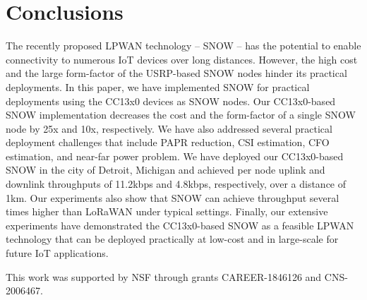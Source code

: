 \documentclass[acmsmall]{acmart}
\begin{document}



\maketitle
\renewcommand{\shortauthors}{Rahman, M. et al.}








\section{Conclusions}\label{sec:conclusion}
The recently proposed LPWAN technology -- SNOW -- has the potential to enable connectivity to numerous IoT devices over long distances. However, the high cost and the large form-factor of the USRP-based SNOW nodes hinder its practical deployments. In this paper, we have implemented SNOW for practical deployments using the CC13x0 devices as SNOW nodes. Our CC13x0-based SNOW implementation decreases the cost and the form-factor of a single SNOW node by 25x and 10x, respectively. 
We have also addressed several practical deployment challenges that include PAPR reduction, CSI estimation, CFO estimation, and near-far power problem. 
We have deployed our CC13x0-based SNOW in the city of Detroit, Michigan and achieved per node uplink and downlink throughputs of 11.2kbps and 4.8kbps, respectively, over a distance of 1km. 
Our experiments also show that SNOW can achieve throughput several times higher than LoRaWAN under typical settings.
Finally, our extensive experiments have demonstrated the CC13x0-based SNOW as a feasible LPWAN technology that can be deployed practically at low-cost and in large-scale for future IoT applications.
\begin{acks}
This work was supported by NSF through grants CAREER-1846126 and CNS-2006467.
\end{acks}



\end{document}
